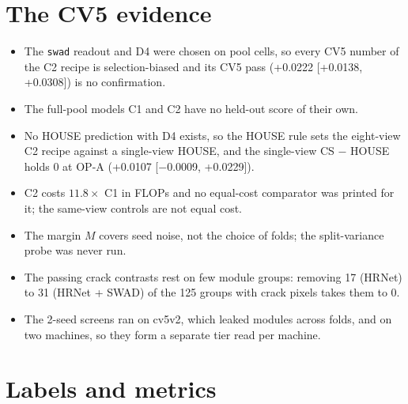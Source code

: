 \section{The CV5 evidence}\label{sec:lim-cv5}

\begin{itemize}
  \item The \texttt{swad} readout and D4 were chosen on pool cells, so every CV5 number of the C2 recipe is selection-biased and its
  CV5 pass (+0.0222 [+0.0138, +0.0308]) is no confirmation.
  \item The full-pool models C1 and C2 have no held-out score of their own.
  \item No HOUSE prediction with D4 exists, so the HOUSE rule sets the eight-view C2 recipe against a single-view HOUSE, and the
  single-view CS $-$ HOUSE holds 0 at OP-A (+0.0107 [$-$0.0009, +0.0229]).
  \item C2 costs $11.8\times$ C1 in FLOPs and no equal-cost comparator was printed for it; the same-view controls are not equal cost.
  \item The margin $M$ covers seed noise, not the choice of folds; the split-variance probe was never run.
  \item The passing crack contrasts rest on few module groups: removing 17 (HRNet) to 31 (HRNet + SWAD) of the 125 groups with
  crack pixels takes them to 0.
  \item The 2-seed screens ran on cv5v2, which leaked modules across folds, and on two machines, so they form a separate tier read
  per machine.
\end{itemize}

\section{Labels and metrics}\label{sec:lim-labels}

